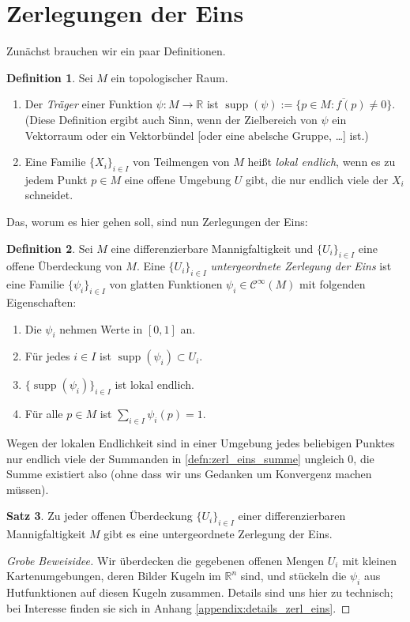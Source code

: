 \documentclass[a4paper]{scrreprt}
\numberwithin{equation}{chapter}
\DeclareMathOperator{\supp}{supp}
\newcommand{\R}{\mathbb{R}}
\newcommand{\sC}{\mathcal{C}^{\infty}}
\theoremstyle{definition}
\newtheorem{defn}{Definition}[section]
\newtheorem{satz}[defn]{Satz}
\begin{document}
\section{Zerlegungen der Eins}
Zunächst brauchen wir ein paar Definitionen.
\begin{defn}
	Sei $M$ ein topologischer Raum.
	\begin{enumerate}[label=(\alph*)]
		\item Der \emph{Träger} einer Funktion $\psi\colon M \to \R$ ist $\supp(\psi) := \overline{\{p \in M \colon f(p) \ne 0\}}$. (Diese Definition ergibt auch Sinn, wenn der Zielbereich von $\psi$ ein Vektorraum oder ein Vektorbündel [oder eine abelsche Gruppe, \dots] ist.)
		\item Eine Familie $\{X_i\}_{i\in I}$ von Teilmengen von $M$ heißt \emph{lokal endlich}, wenn es zu jedem Punkt $p\in M$ eine offene Umgebung $U$ gibt, die nur endlich viele der $X_i$ schneidet.
	\end{enumerate}
\end{defn}
Das, worum es hier gehen soll, sind nun Zerlegungen der Eins:
\begin{defn}
	Sei $M$ eine differenzierbare Mannigfaltigkeit und $\{U_i\}_{i\in I}$ eine offene Überdeckung von $M$. Eine $\{U_i\}_{i\in I}$ \emph{untergeordnete Zerlegung der Eins} ist eine Familie $\{\psi_i\}_{i\in I}$ von glatten Funktionen $\psi_i \in \sC(M)$ mit folgenden Eigenschaften:
	\begin{enumerate}[label=(\roman*)]
		\item Die $\psi_i$ nehmen Werte in $[0,1]$ an.
		\item Für jedes $i\in I$ ist $\supp(\psi_i) \subset U_i$.
		\item $\{\supp(\psi_i)\}_{i\in I}$ ist lokal endlich.
		\item \label{defn:zerl_eins_summe} Für alle $p\in M$ ist $\sum_{i\in I} \psi_i(p) = 1$.
	\end{enumerate}
	Wegen der lokalen Endlichkeit sind in einer Umgebung jedes beliebigen Punktes nur endlich viele der Summanden in \ref{defn:zerl_eins_summe} ungleich 0, die Summe existiert also (ohne dass wir uns Gedanken um Konvergenz machen müssen).
\end{defn}

\begin{satz} \label{satz:zerl_eins}
	Zu jeder offenen Überdeckung $\{U_i\}_{i\in I}$ einer differenzierbaren Mannigfaltigkeit $M$ gibt es eine untergeordnete Zerlegung der Eins.

	\begin{proof}[Grobe Beweisidee]
		Wir überdecken die gegebenen offenen Mengen $U_i$ mit kleinen Kartenumgebungen, deren Bilder Kugeln im $\R^n$ sind, und stückeln die $\psi_i$ aus Hutfunktionen auf diesen Kugeln zusammen. Details sind uns hier zu technisch; bei Interesse finden sie sich in Anhang \ref{appendix:details_zerl_eins}.
	\end{proof}
\end{satz}
\end{document}

